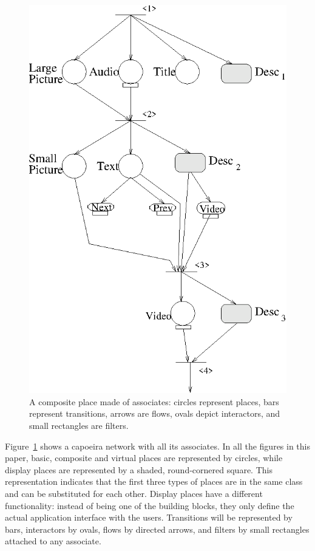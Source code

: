 \documentclass[twocolumn,10pt]{article}
\begin{document}
\begin{figure}[bt]
    \centering
    \includegraphics[width=0.4\textheight]{figures/compositePlace.eps}%
    \caption{A composite place made
    of associates: circles represent places, bars represent
    transitions, arrows are flows, ovals depict interactors, and small
    rectangles are filters.}
    \label{fig:compositePlace}
\end{figure}
\textbf{\textit{}}

Figure~\ref{fig:compositePlace} shows a capoeira network with all its
associates.  In all the figures in this paper, basic, composite and
virtual places are represented by circles, while display places are
represented by a shaded, round-cornered square.  This representation indicates that
the first three types of places are in the same class and can be
substituted for each other.  Display places have a different
functionality: instead of being one of the building blocks, they only
define the actual application interface with the users.
Transitions will be represented by bars, interactors by ovals, flows
by directed arrows, and filters by small rectangles attached to any
associate.
\end{document}
